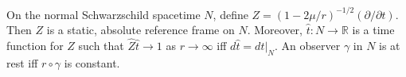 On the normal Schwarzschild spacetime $N$, define $Z = (1 - 2\mu/r)^{-1/2}(\partial/\partial t)$. Then $Z$ is a static, absolute reference frame on $N$. Moreover, $\hat{t}: N \to \mathbb{R}$ is a time function for $Z$ such that $\hat{Z}\hat{t} \to 1$ as $r \to \infty$ iff $d\hat{t} = dt|_N$. An observer $\gamma$ in $N$ is at rest iff $r \circ \gamma$ is constant.
